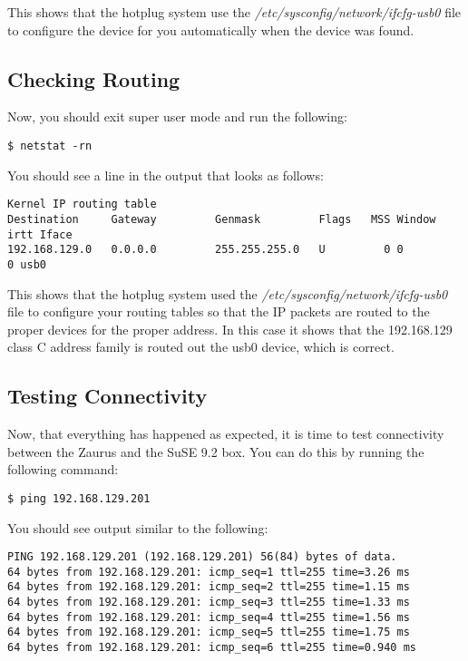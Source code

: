 \documentclass{article}
\begin{document}
This shows that the hotplug system use the
\emph{/etc/sysconfig/network/ifcfg-usb0} file to configure the device for you
automatically when the device was found.

\subsection{Checking Routing}

Now, you should exit super user mode and run the following:

\begin{verbatim}
$ netstat -rn
\end{verbatim}

You should see a line in the output that looks as follows:

\begin{verbatim}
Kernel IP routing table
Destination     Gateway         Genmask         Flags   MSS Window  irtt Iface
192.168.129.0   0.0.0.0         255.255.255.0   U         0 0          0 usb0
\end{verbatim}

This shows that the hotplug system used the
\emph{/etc/sysconfig/network/ifcfg-usb0} file to configure your routing tables
so that the IP packets are routed to the proper devices for the proper
address. In this case it shows that the 192.168.129 class C address family is
routed out the usb0 device, which is correct.

\subsection{Testing Connectivity}

Now, that everything has happened as expected, it is time to test connectivity
between the Zaurus and the SuSE 9.2 box. You can do this by running the
following command:

\begin{verbatim}
$ ping 192.168.129.201
\end{verbatim}

You should see output similar to the following:

\begin{verbatim}
PING 192.168.129.201 (192.168.129.201) 56(84) bytes of data.
64 bytes from 192.168.129.201: icmp_seq=1 ttl=255 time=3.26 ms
64 bytes from 192.168.129.201: icmp_seq=2 ttl=255 time=1.15 ms
64 bytes from 192.168.129.201: icmp_seq=3 ttl=255 time=1.33 ms
64 bytes from 192.168.129.201: icmp_seq=4 ttl=255 time=1.56 ms
64 bytes from 192.168.129.201: icmp_seq=5 ttl=255 time=1.75 ms
64 bytes from 192.168.129.201: icmp_seq=6 ttl=255 time=0.940 ms
\end{verbatim}
\end{document}
